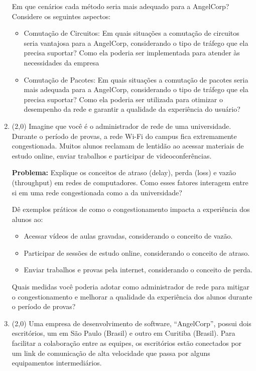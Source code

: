 \documentclass[a4paper,11pt]{modelo/prova}
\begin{document}
\begin{enumerate}
   Em que cenários cada método seria mais adequado para a AngelCorp? Considere os seguintes aspectos:
   \begin{itemize}
      \item Comutação de Circuitos: Em quais situações a comutação de circuitos seria vantajosa para a AngelCorp, considerando o tipo de tráfego que ela precisa suportar? Como ela poderia ser implementada para atender às necessidades da empresa
      \item Comutação de Pacotes: Em quais situações a comutação de pacotes seria mais adequada para a AngelCorp, considerando o tipo de tráfego que ela precisa suportar? Como ela poderia ser utilizada para otimizar o desempenho da rede e garantir a qualidade da experiência do usuário?
   \end{itemize}

   \item (2,0) Imagine que você é o administrador de rede de uma universidade. Durante o período de provas, a rede Wi-Fi do campus fica extremamente congestionada. Muitos alunos reclamam de lentidão ao acessar materiais de estudo online, enviar trabalhos e participar de videoconferências.

   \textbf{Problema:} Explique os conceitos de atraso (delay), perda (loss) e vazão (throughput) em redes de computadores. Como esses fatores interagem entre si em uma rede congestionada como a da universidade?

   Dê exemplos práticos de como o congestionamento impacta a experiência dos alunos ao:
   \begin{itemize}
      \item Acessar vídeos de aulas gravadas, considerando o conceito de vazão.
      \item Participar de sessões de estudo online, considerando o conceito de atraso.
      \item Enviar trabalhos e provas pela internet, considerando o conceito de perda.
   \end{itemize}

   Quais medidas você poderia adotar como administrador de rede para mitigar o congestionamento e melhorar a qualidade da experiência dos alunos durante o período de provas?

   \item (2,0) Uma empresa de desenvolvimento de software, ``AngelCorp'', possui dois escritórios, um em São Paulo (Brasil) e outro em Curitiba (Brasil). Para facilitar a colaboração entre as equipes, os escritórios estão conectados por um link de comunicação de alta velocidade que passa por alguns equipamentos intermediários.
   

\end{enumerate}
\end{document}
